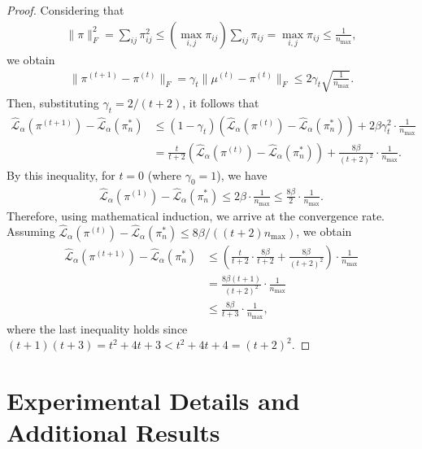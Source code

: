 \documentclass{article}
\theoremstyle{plain}
\theoremstyle{definition}
\theoremstyle{remark}
\begin{document}
\begin{proof}
	Considering that
	\begin{align*}
		\|\pi\|_F^2 = \sum_{ij} \pi_{ij}^2 \leq (\max_{i,j}\pi_{ij}) \sum_{ij} \pi_{ij} = \max_{i,j} \pi_{ij} \leq \frac{1}{n_{\max}} ,
	\end{align*}
	we obtain
	\begin{align*}
		\|\pi^{(t+1)} - \pi^{(t)} \|_F = \gamma_t \|\mu^{(t)} - \pi^{(t)} \|_F \leq 2\gamma_t \sqrt{\frac{1}{n_{\max}}} .
	\end{align*}
	Then, substituting $\gamma_t = 2/(t+2)$, it follows that
	\begin{align*}
		\hat{\mathcal{L}}_{\alpha}(\pi^{(t+1)}) - \hat{\mathcal{L}}_{\alpha}(\pi_n^*) &\leq (1 - \gamma_t)\left(\hat{\mathcal{L}}_{\alpha}(\pi^{(t)}) - \hat{\mathcal{L}}_{\alpha}(\pi_n^*)\right) + 2\beta\gamma_t^2\cdot\frac{1}{n_{\max}} \\
		&= \frac{t}{t+2}\left(\hat{\mathcal{L}}_{\alpha}(\pi^{(t)}) - \hat{\mathcal{L}}_{\alpha}(\pi_n^*)\right) + \frac{8\beta}{(t+2)^2}\cdot\frac{1}{n_{\max}} .
	\end{align*}
	By this inequality, for $t=0$ (where $\gamma_0=1$), we have
	\begin{align*}
		\hat{\mathcal{L}}_{\alpha}(\pi^{(1)}) - \hat{\mathcal{L}}_{\alpha}(\pi_n^*) \leq 2\beta \cdot\frac{1}{n_{\max}} \leq \frac{8\beta}{2}\cdot\frac{1}{n_{\max}} .
	\end{align*}
	Therefore, using mathematical induction, we arrive at the convergence rate. Assuming $\hat{\mathcal{L}}_{\alpha}(\pi^{(t)}) - \hat{\mathcal{L}}_{\alpha}(\pi_n^*) \leq 8\beta/((t+2)n_{\max})$, we obtain
	\begin{align*}
		\hat{\mathcal{L}}_{\alpha}(\pi^{(t+1)}) - \hat{\mathcal{L}}_{\alpha}(\pi_n^*) 
		&\leq \left(\frac{t}{t+2} \cdot \frac{8\beta}{t+2} + \frac{8\beta}{(t+2)^2}\right)\cdot\frac{1}{n_{\max}} \\
		&= \frac{8\beta(t+1)}{(t+2)^2}\cdot\frac{1}{n_{\max}} \\
		&\leq \frac{8\beta}{t+3}\cdot\frac{1}{n_{\max}} ,
	\end{align*}
	where the last inequality holds since $(t+1)(t+3) = t^2+4t+3 < t^2+4t+4 = (t+2)^2$.
\end{proof}


\section{Experimental Details and Additional Results}\label{App:additional-simulation}
\end{document}
